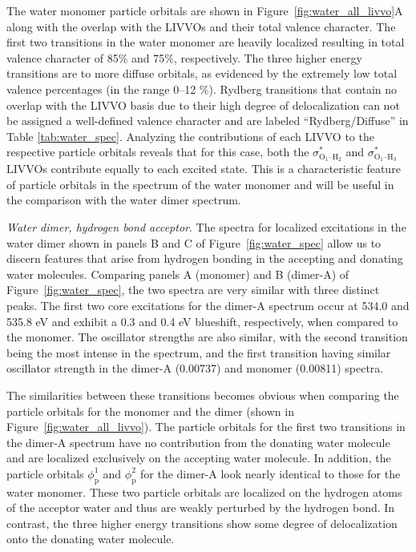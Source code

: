 \documentclass{article}
\begin{document}
The water monomer particle orbitals are shown in Figure~\ref{fig:water_all_livvo}A along with the overlap with the LIVVOs and their total valence character. The first two transitions in the water monomer are heavily localized resulting in total valence character of 85\% and 75\%, respectively.
The three higher energy transitions are to more diffuse orbitals, as evidenced by the extremely low total valence percentages (in the range 0--12 \%). Rydberg transitions that contain no overlap with the LIVVO basis due to their high degree of delocalization can not be assigned a well-defined valence character and are labeled ``Rydberg/Diffuse'' in Table \ref{tab:water_spec}. Analyzing the contributions of each LIVVO to the respective particle orbitals reveals that for this case, both the $\sigma^*_\text{O$_1$--H$_2$}$ and $\sigma^*_\text{O$_1$--H$_3$}$ LIVVOs contribute equally to each excited state. This is a characteristic feature of particle orbitals in the spectrum of the water monomer and will be useful in the comparison with the water dimer spectrum. 

\textit{Water dimer, hydrogen bond acceptor}. 
The spectra for localized excitations in the water dimer shown in panels B and C of Figure~\ref{fig:water_spec} allow us to discern features that arise from hydrogen bonding in the accepting and donating water molecules.
Comparing panels A (monomer) and B (dimer-A) of Figure~\ref{fig:water_spec},  the two spectra are very similar with three distinct peaks. The first two core excitations for the dimer-A spectrum occur at 534.0 and 535.8 eV and exhibit a 0.3 and 0.4 eV blueshift, respectively, when compared to the monomer. The oscillator strengths are also similar, with the second transition being the most intense in the spectrum, and the first transition having similar oscillator strength in the dimer-A (0.00737) and monomer (0.00811) spectra.

The similarities between these transitions becomes obvious when comparing  the particle orbitals for the monomer and the dimer (shown in Figure~\ref{fig:water_all_livvo}).
The particle orbitals for the first two transitions in the dimer-A spectrum have no contribution from the donating water molecule and are localized exclusively on the accepting water molecule. In addition, the particle orbitals $\phi_\mathrm{p}^1$ and $\phi_\mathrm{p}^2$ for the dimer-A look nearly identical to those for the water monomer.
These two particle orbitals are localized on the hydrogen atoms of the acceptor water and thus are weakly perturbed by the hydrogen bond. 
In contrast, the three higher energy transitions show some degree of delocalization onto the donating water molecule.
\end{document}
